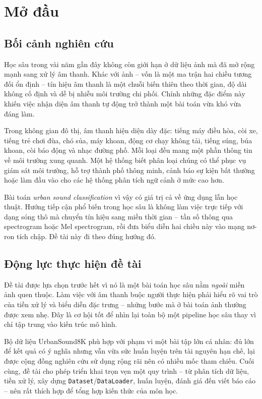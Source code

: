 \section{Mở đầu}

\subsection{Bối cảnh nghiên cứu}

Học sâu trong vài năm gần đây không còn giới hạn ở dữ liệu ảnh mà đã mở rộng
mạnh sang xử lý âm thanh. Khác với ảnh -- vốn là một ma trận hai chiều tương
đối ổn định -- tín hiệu âm thanh là một chuỗi biến thiên theo thời gian, độ dài
không cố định và dễ bị nhiễu môi trường chi phối. Chính những đặc điểm này khiến
việc nhận diện âm thanh tự động trở thành một bài toán vừa khó vừa đáng làm.

Trong không gian đô thị, âm thanh hiện diện dày đặc: tiếng máy điều hòa, còi xe,
tiếng trẻ chơi đùa, chó sủa, máy khoan, động cơ chạy không tải, tiếng súng, búa
khoan, còi báo động và nhạc đường phố. Mỗi loại đều mang một phần thông tin về
môi trường xung quanh. Một hệ thống biết phân loại chúng có thể phục vụ giám sát
môi trường, hỗ trợ thành phố thông minh, cảnh báo sự kiện bất thường hoặc làm
đầu vào cho các hệ thống phân tích ngữ cảnh ở mức cao hơn.

Bài toán \textit{urban sound classification} vì vậy có giá trị cả về ứng dụng
lẫn học thuật. Hướng tiếp cận phổ biến trong học sâu là không làm việc trực tiếp
với dạng sóng thô mà chuyển tín hiệu sang miền thời gian -- tần số thông qua
spectrogram hoặc Mel spectrogram, rồi đưa biểu diễn hai chiều này vào mạng nơ-ron
tích chập. Đề tài này đi theo đúng hướng đó.

\subsection{Động lực thực hiện đề tài}

Đề tài được lựa chọn trước hết vì nó là một bài toán học sâu nằm \textit{ngoài}
miền ảnh quen thuộc. Làm việc với âm thanh buộc người thực hiện phải hiểu rõ vai
trò của tiền xử lý và biểu diễn đặc trưng -- những bước mà ở bài toán ảnh thường
được xem nhẹ. Đây là cơ hội tốt để nhìn lại toàn bộ một pipeline học sâu thay vì
chỉ tập trung vào kiến trúc mô hình.

Bộ dữ liệu UrbanSound8K phù hợp với phạm vi một bài tập lớn cá nhân: đủ lớn để
kết quả có ý nghĩa nhưng vẫn vừa sức huấn luyện trên tài nguyên hạn chế, lại được
cộng đồng nghiên cứu sử dụng rộng rãi nên có nhiều mốc tham chiếu. Cuối cùng, đề
tài cho phép triển khai trọn vẹn một quy trình -- từ phân tích dữ liệu, tiền xử
lý, xây dựng \texttt{Dataset}/\texttt{DataLoader}, huấn luyện, đánh giá đến viết
báo cáo -- nên rất thích hợp để tổng hợp kiến thức của môn học.

